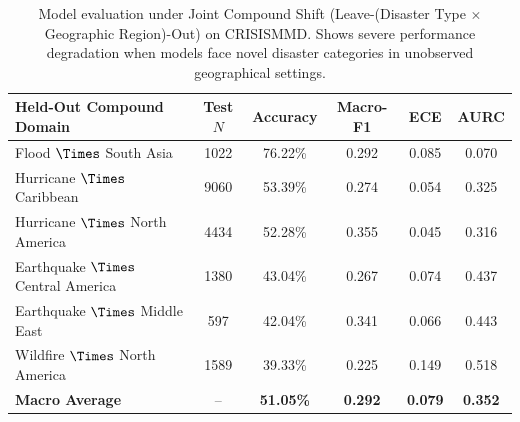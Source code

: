 \begin{table}[t]
\centering
\caption{Model evaluation under Joint Compound Shift (Leave-(Disaster Type $\times$ Geographic Region)-Out) on CRISISMMD. Shows severe performance degradation when models face novel disaster categories in unobserved geographical settings.}
\label{tab:compound_shift_crisismmd}
\begin{tabular}{lccccc}
\toprule
\textbf{Held-Out Compound Domain} & \textbf{Test $N$} & \textbf{Accuracy} & \textbf{Macro-F1} & \textbf{ECE} & \textbf{AURC} \\
\midrule
Flood $\Times$ South Asia & 1022 & 76.22\% & 0.292 & 0.085 & 0.070 \\
Hurricane $\Times$ Caribbean & 9060 & 53.39\% & 0.274 & 0.054 & 0.325 \\
Hurricane $\Times$ North America & 4434 & 52.28\% & 0.355 & 0.045 & 0.316 \\
Earthquake $\Times$ Central America & 1380 & 43.04\% & 0.267 & 0.074 & 0.437 \\
Earthquake $\Times$ Middle East & 597 & 42.04\% & 0.341 & 0.066 & 0.443 \\
Wildfire $\Times$ North America & 1589 & 39.33\% & 0.225 & 0.149 & 0.518 \\
\midrule
\textbf{Macro Average} & -- & \textbf{51.05\%} & \textbf{0.292} & \textbf{0.079} & \textbf{0.352} \\
\bottomrule
\end{tabular}
\end{table}
